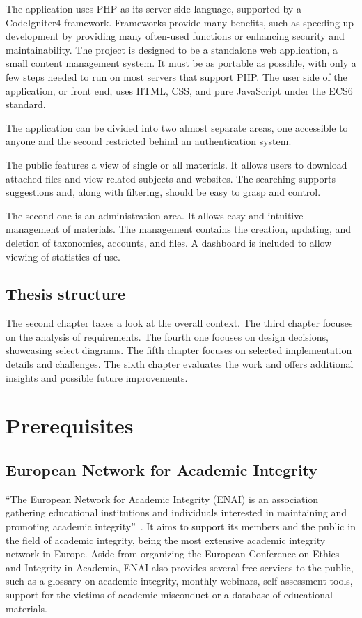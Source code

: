 \documentclass[
  digital,     %
  oneside,     %
  nosansbold,  %
  colorbold, %
  lof,         %
  lot,         %
]{fithesis4}
\begin{document}
The application uses PHP as its \mbox{server-side} language, supported by a CodeIgniter4
framework. Frameworks provide many benefits, such as speeding up development by
providing many \mbox{often-used} functions or enhancing security and maintainability.
The project is designed to be a standalone web application, a small content
management system. It must be as portable as possible, with only a few steps
needed to run on most servers that support PHP. The user side of the application,
or front end, uses HTML, CSS, and pure JavaScript under the ECS6 standard.

The application can be divided into two almost separate areas, one accessible to
anyone and the second restricted behind an authentication system.

The public features a view of single or all materials. It allows users to
download attached files and view related subjects and websites. The searching
supports suggestions and, along with filtering, should be easy to grasp and
control.

The second one is an administration area. It allows easy and intuitive management
of materials. The management contains the creation, updating, and deletion of
taxonomies, accounts, and files. A dashboard is included to allow viewing of
statistics of use.

\section{Thesis structure}

The second chapter takes a look at the overall context. The third chapter
focuses on the analysis of requirements. The fourth one focuses on design decisions,
showcasing select diagrams. The fifth chapter focuses on selected implementation
details and challenges. The sixth chapter evaluates the work and offers
additional insights and possible future improvements.

\chapter{Prerequisites}

\section{European Network for Academic Integrity}

“The European Network for Academic Integrity (ENAI) is an association gathering
educational institutions and individuals interested in maintaining and promoting
academic integrity”~\cite{enai_about}. It aims to support its members and
the public in the field of academic integrity, being the most extensive academic
integrity network in Europe. Aside from organizing the European Conference on Ethics
and Integrity in Academia, ENAI also provides several free services to the public,
such as a glossary on academic integrity, monthly webinars, self-assessment tools,
support for the victims of academic misconduct or a database of educational materials.
\end{document}
